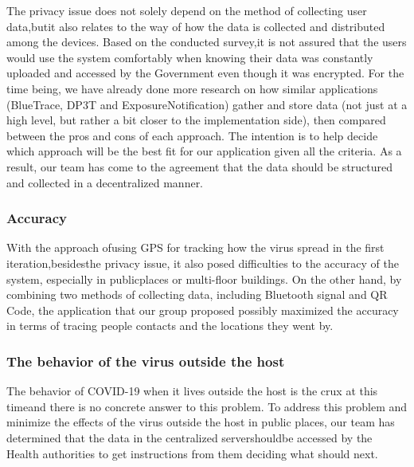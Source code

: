 \begin{itemize}
          \par The privacy issue does not solely depend on the  method of collecting user data,butit also relates to the way of how the data is collected and distributed among the devices. Based on the conducted survey,it is not assured that the users would use the system comfortably when knowing their data was constantly uploaded and accessed by the Government even though it was  encrypted. For  the  time  being,  we  have  already  done  more  research  on  how  similar applications (BlueTrace, DP3T and ExposureNotification) gather and store data (not just at a high level, but rather a bit closer to the implementation side), then compared between the pros and cons of each approach. The intention is to help decide which approach will be the best fit for our application given all the criteria. As a result, our team has come to the agreement that the data should be structured and collected in a decentralized manner.
      \end{itemize}
    
    \subsubsection{Accuracy}
      \par With the approach ofusing GPS for tracking how the virus spread in the first iteration,besidesthe privacy issue, it also posed difficulties to the accuracy of the system, especially in publicplaces or multi-floor buildings. On the other hand, by combining two methods of collecting data, including Bluetooth signal and QR Code, the application that our group proposed possibly maximized the accuracy in terms of tracing people contacts and the locations they went by.
    
    \subsubsection{The behavior of the virus outside the host}
      \par The behavior of COVID-19 when it lives outside the host is the crux at this timeand there is no concrete answer to this problem. To address this problem and minimize the effects of the virus  outside  the  host  in  public  places, our  team  has  determined  that the  data  in  the centralized servershouldbe accessed by the Health authorities to get instructions from them deciding what should next.
    
